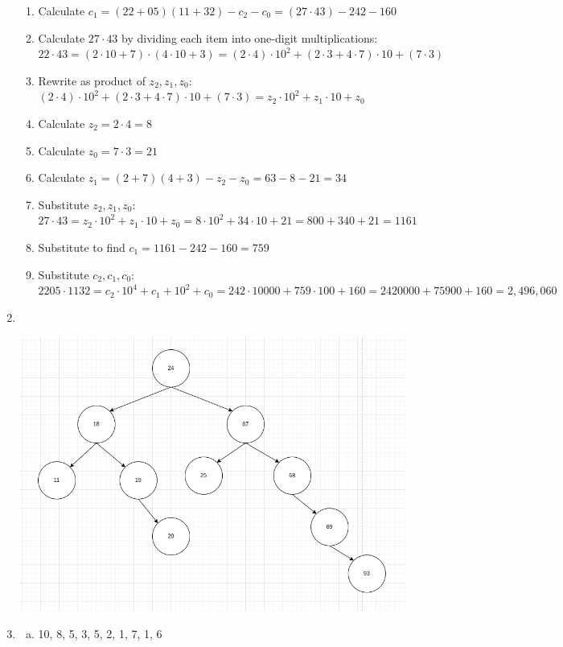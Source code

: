 \documentclass[a4paper,10pt]{article}
\begin{document}
\begin{enumerate}
\begin{enumerate}[Step 1.]
	\item Calculate $c_1 = (22 + 05)(11+32) - c_2 - c_0 = (27 \cdot 43) - 242 - 160$
	\item Calculate $27 \cdot 43$ by dividing each item into one-digit multiplications: $22 \cdot 43 = (2 \cdot 10 + 7) \cdot (4 \cdot 10 + 3) = (2 \cdot 4) \cdot 10^2 + (2 \cdot 3 + 4 \cdot 7) \cdot 10 + (7 \cdot 3)$
	\item Rewrite as product of $z_2, z_1, z_0$: $(2 \cdot 4) \cdot 10^2 + (2 \cdot 3 + 4 \cdot 7) \cdot 10 + (7 \cdot 3) = z_2 \cdot 10^2 + z_1 \cdot 10 + z_0$
	\item Calculate $z_2 = 2 \cdot 4 = 8$
	\item Calculate $z_0 = 7 \cdot 3 = 21$
	\item Calculate $z_1 = (2+7)(4+3) - z_2 - z_0 = 63 - 8 - 21 = 34$
	\item Substitute $z_2, z_1, z_0$: $27 \cdot 43 = z_2 \cdot 10^2 + z_1 \cdot 10 + z_0 = 8 \cdot 10^2 + 34 \cdot 10 + 21 = 800 + 340 + 21 = 1161$
	
	\item Substitute to find $c_1 = 1161 - 242 - 160 = 759$
	\item Substitute $c_2, c_1, c_0$: $2205 \cdot 1132 = c_2 \cdot 10^4 + c_1 + 10^2 + c_0 = 242 \cdot 10000 + 759 \cdot 100 + 160 = 2420000 + 75900 + 160 = \boxed{2,496,060}$

\end{enumerate}

\item \ 

\centerline{\includegraphics[scale=0.5]{fig1}}

\item \begin{enumerate}[(a)]
	\item 10, 8, 5, 3, 5, 2, 1, 7, 1, 6
	

\end{enumerate}
\end{enumerate}
\end{document}
